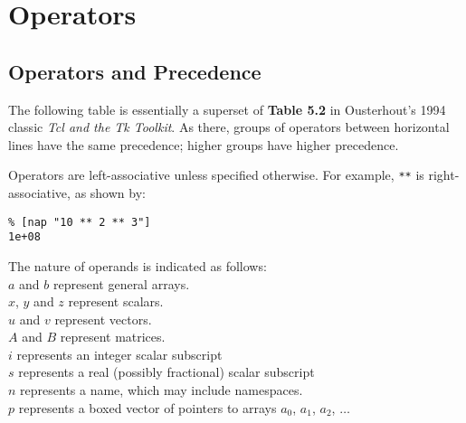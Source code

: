 
\section{Operators}

\subsection{Operators and Precedence}
    \label{op-Precedence}
  
 The following table is essentially a superset of 
  \textbf{Table 5.2} in Ousterhout's 1994 classic 
  \emph{Tcl and the Tk Toolkit}. As there, groups of operators
  between horizontal lines have the same precedence; higher groups have
  higher precedence.
  
 Operators are left-associative unless specified otherwise. For
  example, 
  \texttt{**} is right-associative, as shown by:
  \begin{verbatim}
% [nap "10 ** 2 ** 3"]
1e+08
\end{verbatim}
  
 The nature of operands is indicated as follows:
  \\
  $a$ and 
  $b$ represent general arrays.
  \\
  $x$, 
  $y$ and 
  $z$ represent scalars.
  \\
  $u$ and 
  $v$ represent vectors.
  \\
  $A$ and 
  $B$ represent matrices.
  \\
  $i$ represents an integer scalar subscript
  \\
  $s$ represents a real (possibly fractional) scalar subscript
  \\
  $n$ represents a name, which may include namespaces.
  \\
  $p$ represents a boxed vector of pointers to arrays 
  $a_0$, 
  $a_1$, 
  $a_2$, 
  $\ldots$
  
